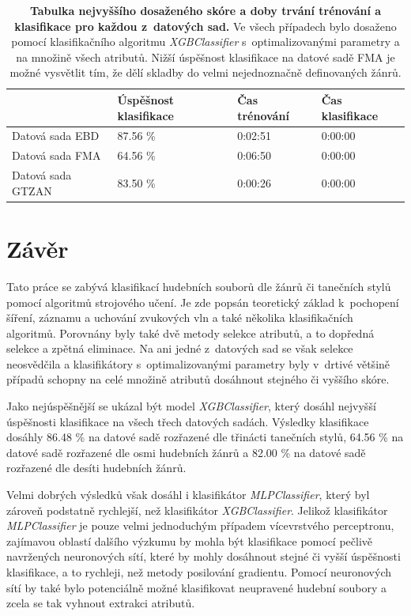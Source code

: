 \begin{table}[H]
	\vskip6pt
    \caption{\textbf{Tabulka nejvyššího dosaženého skóre a doby trvání trénování a klasifikace pro každou z~datových sad.} Ve všech případech bylo dosaženo pomocí klasifikačního algoritmu \textit{XGBClassifier} s~optimalizovanými parametry a na množině všech atributů. Nižší úspěšnost klasifikace na datové sadě FMA je možné vysvětlit tím, že dělí skladby do velmi nejednoznačně definovaných žánrů.}
    \label{score_optimised_CV_test_set}  
    \vskip6pt
	\centering
    \begin{tabular}{|l|lll|}
    \hline
                        & Úspěšnost klasifikace & Čas trénování & Čas klasifikace \\ \hline
    Datová sada EBD   & 87.56 \%              & 0:02:51       & 0:00:00         \\
    \rowcolor[HTML]{EFEFEF} 
    Datová sada FMA   & 64.56 \%              & 0:06:50       & 0:00:00         \\
    Datová sada GTZAN & 83.50 \%              & 0:00:26       & 0:00:00         \\ \hline
    \end{tabular}
\end{table}

\chapter{Závěr}
\label{zaver}
Tato práce se zabývá klasifikací hudebních souborů dle žánrů či tanečních stylů pomocí algoritmů strojového učení. Je zde popsán teoretický základ k~pochopení šíření, záznamu a uchování zvukových vln a také několika klasifikačních algoritmů. Porovnány byly také dvě metody selekce atributů, a to dopředná selekce a zpětná eliminace. Na ani jedné z~datových sad se však selekce neosvědčila a klasifikátory s~optimalizovanými parametry byly v~drtivé většině případů schopny na celé množině atributů dosáhnout stejného či vyššího skóre.

Jako nejúspěšnější se ukázal být model \textit{XGBClassifier}, který dosáhl nejvyšší úspěšnosti klasifikace na všech třech datových sadách. Výsledky klasifikace dosáhly 86.48 \% na datové sadě  rozřazené dle třinácti tanečních stylů, 64.56 \% na datové sadě  rozřazené dle osmi hudebních žánrů a 82.00 \% na datové sadě  rozřazené dle desíti hudebních žánrů.

Velmi dobrých výsledků však dosáhl i klasifikátor \textit{MLPClassifier}, který byl zároveň podstatně rychlejší, než klasifikátor \textit{XGBClassifier}. Jelikož klasifikátor \textit{MLPClassifier} je pouze velmi jednoduchým případem vícevrstvého perceptronu, zajímavou oblastí dalšího výzkumu by mohla být klasifikace pomocí pečlivě navržených neuronových sítí, které by mohly dosáhnout stejné či vyšší úspěšnosti klasifikace, a to rychleji, než metody posilování gradientu. Pomocí neuronových sítí by také bylo potenciálně možné klasifikovat neupravené hudební soubory a zcela se tak vyhnout extrakci atributů.

